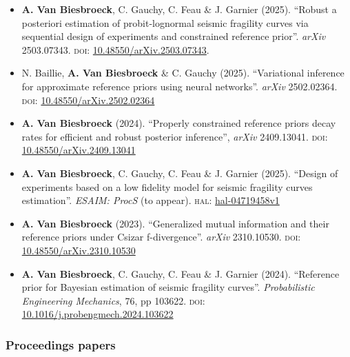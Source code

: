 \begin{itemize}
    \item \textbf{A. Van Biesbroeck}, C. Gauchy, C. Feau \& J. Garnier (2025). ``Robust a posteriori estimation of probit-lognormal seismic fragility curves via sequential design of experiments and constrained reference prior''. \emph{arXiv} 2503.07343. \textsc{doi:} \href{https://dx.doi.org/10.48550/arXiv.2503.07343}{10.48550/arXiv.2503.07343}.
    \item N. Baillie, \textbf{A. Van Biesbroeck} \& C. Gauchy (2025). ``Variational inference for approximate reference priors using neural networks''. \emph{arXiv} 2502.02364. \textsc{doi:} \href{https://dx.doi.org/10.48550/arXiv.2502.02364}{10.48550/arXiv.2502.02364}
    \item \textbf{A. Van Biesbroeck} (2024). ``Properly constrained reference priors decay rates for efficient and robust posterior inference'', \emph{arXiv} 2409.13041. \textsc{doi:} \href{https://dx.doi.org/10.48550/arXiv.2409.13041}{10.48550/arXiv.2409.13041}
    \item \textbf{A. Van Biesbroeck}, C. Gauchy, C. Feau \& J. Garnier (2025). ``Design of experiments based on a low fidelity model for seismic fragility curves estimation''. \emph{ESAIM: ProcS} (to appear). \textsc{hal:} \href{https://hal.science/hal-04719458v1}{hal-04719458v1}
    \item \textbf{A. Van Biesbroeck} (2023). ``Generalized mutual information and their reference priors under Csizar f-divergence''. \emph{arXiv} 2310.10530. \textsc{doi:} \href{https://dx.doi.org/10.48550/arXiv.2310.10530}{10.48550/arXiv.2310.10530}
    \item \textbf{A. Van Biesbroeck}, C. Gauchy, C. Feau \& J. Garnier (2024). ``Reference prior for Bayesian estimation of seismic fragility curves''. \emph{Probabilistic Engineering Mechanics}, 76, pp 103622. \textsc{doi:} \href{https://dx.doi.org/10.1016/j.probengmech.2024.103622}{10.1016/j.probengm\-ech.2024.103622}
\end{itemize}






\subsubsection{Proceedings papers}



